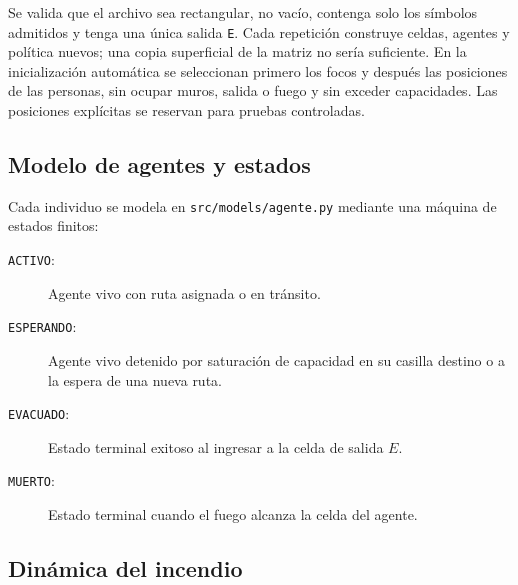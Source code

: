 \documentclass[11pt,letterpaper]{article}
\begin{document}
Se valida que el archivo sea rectangular, no vacío, contenga solo los símbolos admitidos y tenga una única salida \texttt{E}. Cada repetición construye celdas, agentes y política nuevos; una copia superficial de la matriz no sería suficiente. En la inicialización automática se seleccionan primero los focos y después las posiciones de las personas, sin ocupar muros, salida o fuego y sin exceder capacidades. Las posiciones explícitas se reservan para pruebas controladas.

\subsection{Modelo de agentes y estados}

Cada individuo se modela en \texttt{src/models/agente.py} mediante una máquina de estados finitos:

\begin{description}
    \item[\texttt{ACTIVO}:] Agente vivo con ruta asignada o en tránsito.
    \item[\texttt{ESPERANDO}:] Agente vivo detenido por saturación de capacidad en su casilla destino o a la espera de una nueva ruta.
    \item[\texttt{EVACUADO}:] Estado terminal exitoso al ingresar a la celda de salida $E$.
    \item[\texttt{MUERTO}:] Estado terminal cuando el fuego alcanza la celda del agente.
\end{description}

\subsection{Dinámica del incendio}
\end{document}
